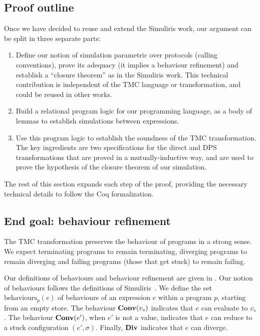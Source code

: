 \subsection{Proof outline}

Once we have decided to reuse and extend the Simuliris work, our argument can be split in three separate parts:

\begin{enumerate}

\item Define our notion of simulation parametric over protocols (calling conventions), prove its adequacy (it implies a behaviour refinement) and establish a ``closure theorem'' as in the Simuliris work.
%
  This technical contribution is independent of the TMC language or transformation, and could be reused in other works.

\item Build a relational program logic for our programming language, as a body of lemmas to establish simulations between expressions.

\item Use this program logic to establish the soundness of the TMC transformation.
%
The key ingredients are two specifications for the direct and DPS transformations that are proved in a mutually-inductive way, and are used to prove the hypothesis of the closure theorem of our simulation.
\end{enumerate}

The rest of this section expands each step of the proof, providing the necessary technical details to follow the Coq formalization.

\subsection{End goal: behaviour refinement}

The TMC transformation preserves the behaviour of programs in a strong sense.
%
We expect terminating programs to remain terminating, diverging programs to remain diverging and failing programs (those that get stuck) to remain failing.

Our definitions of behaviours and behaviour refinement are given in .
%
Our notion of behaviours follows the definitions of Simuliris~\citep*{TODO-simuliris}.
%
We define the set $\mathrm{behaviours}_p(e)$ of behaviours of an expression $e$ within a program $p$, starting from an empty store.
%
The behaviour $\constr{Conv}(v_s)$ indicates that $e$ can evaluate to $v_s$.
%
The behaviour $\constr{Conv}(e')$, when $e'$ is not a value, indicates that $e$ can reduce to a stuck configuration $(e', \sigma)$.
%
Finally, $\constr{Div}$ indicates that $e$ can diverge.

